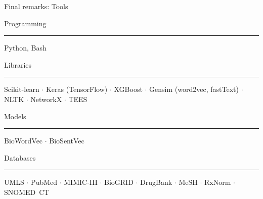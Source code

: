 \begin{frame}[t]{Final remarks: Tools}


Programming\par%
\vspace*{-0.75\baselineskip}%
\rule{0.4\textwidth}{0.4pt}%

\begingroup\footnotesize
Python, Bash
\endgroup

\bigskip

Libraries\par%
\vspace*{-0.75\baselineskip}%
\rule{0.4\textwidth}{0.4pt}%

\begingroup\footnotesize
Scikit-learn $\cdot$ Keras (TensorFlow) $\cdot$ XGBoost $\cdot$ Gensim (word2vec, fastText) $\cdot$ NLTK $\cdot$ NetworkX $\cdot$ TEES
\endgroup

\bigskip

Models\par%
\vspace*{-0.75\baselineskip}%
\rule{0.4\textwidth}{0.4pt}%

\begingroup\footnotesize
BioWordVec $\cdot$ BioSentVec
\endgroup

\bigskip

Databases\par%
\vspace*{-0.75\baselineskip}%
\rule{0.4\textwidth}{0.4pt}%

\begingroup\footnotesize
UMLS $\cdot$ PubMed $\cdot$ MIMIC-III $\cdot$ BioGRID $\cdot$ DrugBank $\cdot$ MeSH $\cdot$ RxNorm $\cdot$ SNOMED~CT
\endgroup

\end{frame}
